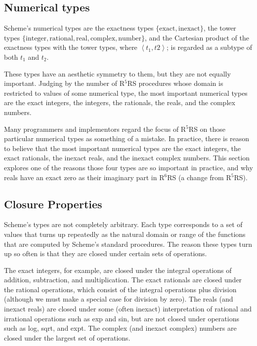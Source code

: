 \documentclass[twoside,twocolumn]{algol60}
\newcommand{\rn}[1]{R$^{#1}$RS}
\begin{document}
\subsection{Numerical types}

Scheme's numerical types are the exactness types $\{ \textrm{exact},
\textrm{inexact} \}$, the tower types $\{ \textrm{integer},
\textrm{rational}, \textrm{real}, \textrm{complex}, \textrm{number}
\}$, and the Cartesian product of the exactness types with the tower
types, where $\left< t_1, t2 \right>$; is regarded as a subtype of
both $t_1$ and $t_2$.

These types have an aesthetic symmetry to them, but they are not
equally important.  Judging by the number of \rn{5} procedures whose
domain is restricted to values of some numerical type, the most
important numerical types are the exact integers, the integers, the
rationals, the reals, and the complex numbers.

Many programmers and implementors regard the focus of \rn{5} on those
particular numerical types as something of a mistake.  In practice,
there is reason to believe that the most important numerical types are
the exact integers, the exact rationals, the inexact reals, and the
inexact complex numbers.  This section explores one of the reasons
those four types are so important in practice, and why reals have an
exact zero as their imaginary part in \rn{6} (a change from \rn{5}).

\subsection{Closure Properties}
\label{closurepropertiessection}

Scheme's types are not completely arbitrary.  Each type corresponds to
a set of values that turns up repeatedly as the natural domain or
range of the functions that are computed by Scheme's standard
procedures.  The reason these types turn up so often is that they are
closed under certain sets of operations.

The exact integers, for example, are closed under the integral
operations of addition, subtraction, and multiplication.  The exact
rationals are closed under the rational operations, which consist of
the integral operations plus division (although we must make a special
case for division by zero).  The reals (and inexact reals) are closed
under some (often inexact) interpretation of rational and irrational
operations such as exp and sin, but are not closed under operations
such as {\cf log}, {\cf sqrt}, and {\cf expt}.  The complex (and
inexact complex) numbers are closed under the largest set of
operations.
\end{document}
